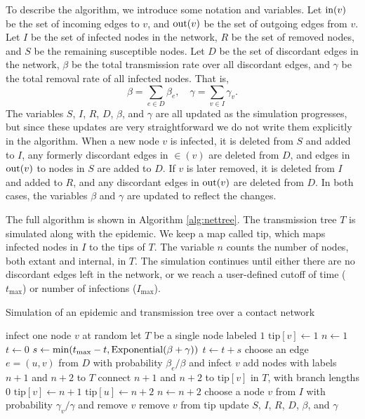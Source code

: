 To describe the algorithm, we introduce some notation and variables. Let
$\operatorname{in}(v)$ be the set of incoming edges to $v$, and $\operatorname{out}(v)$ be the set of
outgoing edges from $v$. Let $I$ be the set of infected nodes in the network,
$R$ be the set of removed nodes, and $S$ be the remaining susceptible nodes.
Let $D$ be the set of discordant edges in the network, $\beta$ be the 
total transmission rate over all discordant edges, and $\gamma$ be the total
removal rate of all infected nodes. That is,
\[
  \beta = \sum_{e \in D} \beta_e, \quad
  \gamma = \sum_{v \in I} \gamma_v.
\]
The variables $S$, $I$, $R$, $D$, $\beta$, and $\gamma$ are all updated as the
simulation progresses, but since these updates are very straightforward we do
not write them explicitly in the algorithm. When a new node $v$ is infected, it
is deleted from $S$ and added to $I$, any formerly discordant edges in $\in(v)$
are deleted from $D$, and edges in $\operatorname{out}(v)$ to nodes in $S$ are added to $D$.
If $v$ is later removed, it is deleted from $I$ and added to $R$, and any
discordant edges in $\operatorname{out}(v)$ are deleted from $D$. In both cases, the
variables $\beta$ and $\gamma$ are updated to reflect the changes. 

\newcommand{\tip}{\mathrm{tip}}

The full algorithm is shown in Algorithm \ref{alg:nettree}. The transmission
tree $T$ is simulated along with the epidemic. We keep a map called $\tip$,
which maps infected nodes in $I$ to the tips of $T$. The variable $n$ counts
the number of nodes, both extant and internal, in $T$. The simulation continues
until either there are no discordant edges left in the network, or we reach a
user-defined cutoff of time ($t_{\max}$) or number of infections ($I_{\max}$). 

\begin{algorithm}
  \label{alg:nettree}
  \caption{Simulation of an epidemic and transmission tree over a contact network}
  \begin{algorithmic}
    \State infect one node $v$ at random
    \State let $T$ be a single node labeled $1$
    \State $\tip[v] \gets 1$
    \State $n \gets 1$
    \State $t \gets 0$
      \State $s \gets \min(t_{\max} - t, \operatorname{Exponential}(\beta + \gamma))$
      \For{$v \in \tip$}
        \State{extend the branch length of $\tip[v]$ by $s$}
      \EndFor
      \State $t \gets t + s$
          \State choose an edge $e = (u, v)$ from $D$ with probability $\beta_e / \beta$
                 and infect $v$
          \State add nodes with labels $n+1$ and $n+2$ to $T$
          \State connect $n+1$ and $n+2$ to $\tip[v]$ in $T$, with branch lengths $0$
          \State $\tip[v] \gets n + 1$
          \State $\tip[u] \gets n + 2$
          \State $n \gets n + 2$
        \Else
          \State choose a node $v$ from $I$ with probability $\gamma_v / \gamma$
                 and remove $v$
          \State remove $v$ from $\tip$
        \EndIf
        \State update $S$, $I$, $R$, $D$, $\beta$, and $\gamma$
      \EndIf
    \EndWhile
  \end{algorithmic}
\end{algorithm}

